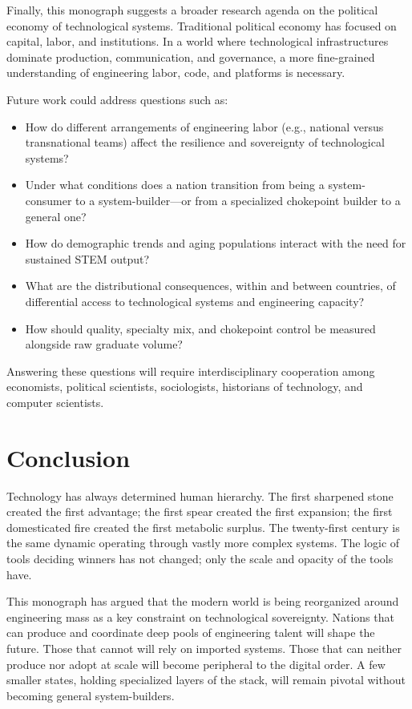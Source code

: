 \documentclass[12pt,letterpaper]{article}
\begin{document}
Finally, this monograph suggests a broader research agenda on the political economy of technological systems. Traditional political economy has focused on capital, labor, and institutions. In a world where technological infrastructures dominate production, communication, and governance, a more fine-grained understanding of engineering labor, code, and platforms is necessary.

Future work could address questions such as:
\begin{itemize}
  \item How do different arrangements of engineering labor (e.g., national versus transnational teams) affect the resilience and sovereignty of technological systems?
  \item Under what conditions does a nation transition from being a system-consumer to a system-builder---or from a specialized chokepoint builder to a general one?
  \item How do demographic trends and aging populations interact with the need for sustained STEM output?
  \item What are the distributional consequences, within and between countries, of differential access to technological systems and engineering capacity?
  \item How should quality, specialty mix, and chokepoint control be measured alongside raw graduate volume?
\end{itemize}

Answering these questions will require interdisciplinary cooperation among economists, political scientists, sociologists, historians of technology, and computer scientists.

\section{Conclusion}

Technology has always determined human hierarchy. The first sharpened stone created the first advantage; the first spear created the first expansion; the first domesticated fire created the first metabolic surplus. The twenty-first century is the same dynamic operating through vastly more complex systems. The logic of tools deciding winners has not changed; only the scale and opacity of the tools have.

This monograph has argued that the modern world is being reorganized around engineering mass as a key constraint on technological sovereignty. Nations that can produce and coordinate deep pools of engineering talent will shape the future. Those that cannot will rely on imported systems. Those that can neither produce nor adopt at scale will become peripheral to the digital order. A few smaller states, holding specialized layers of the stack, will remain pivotal without becoming general system-builders.
\end{document}
